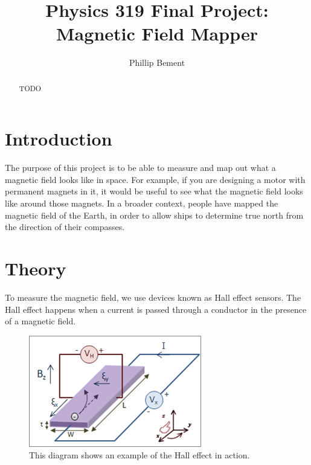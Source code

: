 \documentclass[]{article}
\title{Physics 319 Final Project: Magnetic Field Mapper}
\author{Phillip Bement}
\begin{document}
\maketitle

\begin{abstract}
TODO
\end{abstract}


\section*{Introduction}

The purpose of this project is to be able to measure and map out what a magnetic field looks like in space. For example, if you are designing a motor with permanent magnets in it, it would be useful to see what the magnetic field looks like around those magnets. In a broader context, people have mapped the magnetic field of the Earth, in order to allow ships to determine true north from the direction of their compasses.


\section*{Theory}

To measure the magnetic field, we use devices known as Hall effect sensors. The Hall effect happens when a current is passed through a conductor in the presence of a magnetic field.

\begin{figure}
\begin{center}
\caption{This diagram shows an example of the Hall effect in action. \label{fig:hall}}
\includegraphics[width=.9\linewidth]{Hall_Effect_Measurement_Setup_for_Electrons}
\end{center}
\end{figure}
\end{document}

